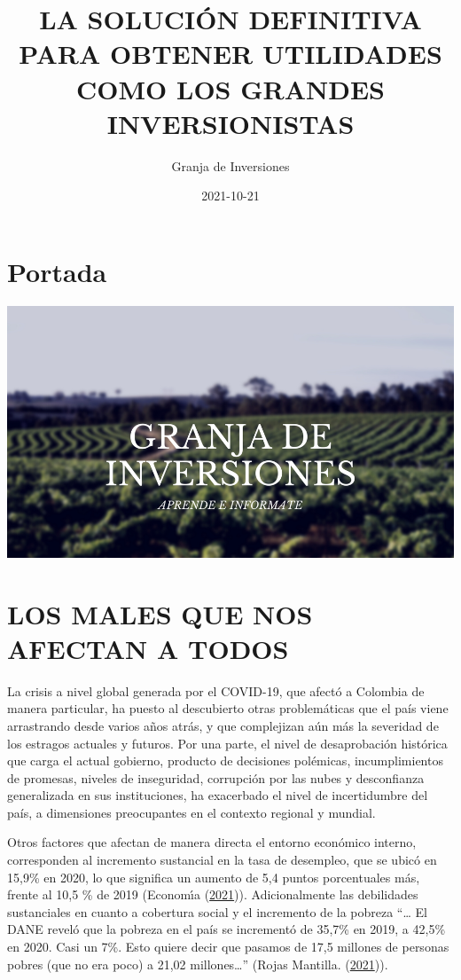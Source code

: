 \documentclass[
]{book}
\title{LA SOLUCIÓN DEFINITIVA PARA OBTENER UTILIDADES COMO LOS GRANDES INVERSIONISTAS}
\author{Granja de Inversiones}
\date{2021-10-21}
\begin{document}
\maketitle

{
\setcounter{tocdepth}{1}
\tableofcontents
}
\hypertarget{portada}{%
\chapter*{Portada}\label{portada}}

\includegraphics[width=1\linewidth,height=1\textheight]{imagenes/Granja}

\hypertarget{los-males-que-nos-afectan-a-todos}{%
\chapter{LOS MALES QUE NOS AFECTAN A TODOS}\label{los-males-que-nos-afectan-a-todos}}

La crisis a nivel global generada por el COVID-19, que afectó a Colombia de manera particular, ha puesto al descubierto otras problemáticas que el país viene arrastrando desde varios años atrás, y que complejizan aún más la severidad de los estragos actuales y futuros. Por una parte, el nivel de desaprobación histórica que carga el actual gobierno, producto de decisiones polémicas, incumplimientos de promesas, niveles de inseguridad, corrupción por las nubes y desconfianza generalizada en sus instituciones, ha exacerbado el nivel de incertidumbre del país, a dimensiones preocupantes en el contexto regional y mundial.

Otros factores que afectan de manera directa el entorno económico interno, corresponden al incremento sustancial en la tasa de desempleo, que se ubicó en 15,9\% en 2020, lo que significa un aumento de 5,4 puntos porcentuales más, frente al 10,5 \% de 2019 (Economı́a (\protect\hyperlink{ref-Portafolio2021Desempleo}{2021})). Adicionalmente las debilidades sustanciales en cuanto a cobertura social y el incremento de la pobreza ``\ldots{} El DANE reveló que la pobreza en el país se incrementó de 35,7\% en 2019, a 42,5\% en 2020. Casi un 7\%. Esto quiere decir que pasamos de 17,5 millones de personas pobres (que no era poco) a 21,02 millones\ldots{}'' (Rojas Mantilla. (\protect\hyperlink{ref-Rojas2021Concejo}{2021})).
\end{document}
